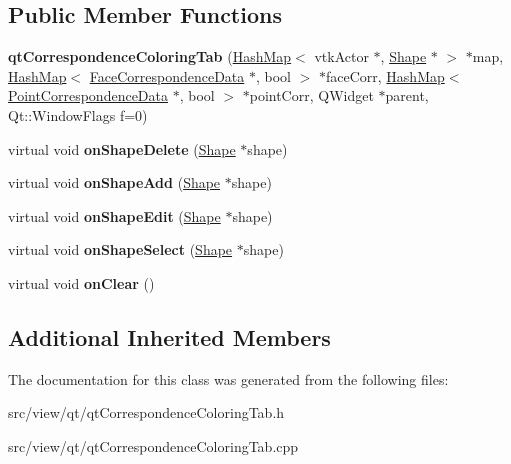 \subsection*{Public Member Functions}
\begin{DoxyCompactItemize}
\item 
\hypertarget{classqt_correspondence_coloring_tab_a8f793bb0b1e4fcd2930a6fc8dda03ff4}{}{\bfseries qt\+Correspondence\+Coloring\+Tab} (\hyperlink{class_hash_map}{Hash\+Map}$<$ vtk\+Actor $\ast$, \hyperlink{class_shape}{Shape} $\ast$ $>$ $\ast$map, \hyperlink{class_hash_map}{Hash\+Map}$<$ \hyperlink{class_face_correspondence_data}{Face\+Correspondence\+Data} $\ast$, bool $>$ $\ast$face\+Corr, \hyperlink{class_hash_map}{Hash\+Map}$<$ \hyperlink{class_point_correspondence_data}{Point\+Correspondence\+Data} $\ast$, bool $>$ $\ast$point\+Corr, Q\+Widget $\ast$parent, Qt\+::\+Window\+Flags f=0)\label{classqt_correspondence_coloring_tab_a8f793bb0b1e4fcd2930a6fc8dda03ff4}

\item 
\hypertarget{classqt_correspondence_coloring_tab_a731f7da293d21c87059515a10d36d1e3}{}virtual void {\bfseries on\+Shape\+Delete} (\hyperlink{class_shape}{Shape} $\ast$shape)\label{classqt_correspondence_coloring_tab_a731f7da293d21c87059515a10d36d1e3}

\item 
\hypertarget{classqt_correspondence_coloring_tab_aa42744063025d9b0d29b9a83817c0f27}{}virtual void {\bfseries on\+Shape\+Add} (\hyperlink{class_shape}{Shape} $\ast$shape)\label{classqt_correspondence_coloring_tab_aa42744063025d9b0d29b9a83817c0f27}

\item 
\hypertarget{classqt_correspondence_coloring_tab_a30c174762eda93581d7f93bf4d247788}{}virtual void {\bfseries on\+Shape\+Edit} (\hyperlink{class_shape}{Shape} $\ast$shape)\label{classqt_correspondence_coloring_tab_a30c174762eda93581d7f93bf4d247788}

\item 
\hypertarget{classqt_correspondence_coloring_tab_af02e0bad7197ef2a4fba5e67a6d5f4e2}{}virtual void {\bfseries on\+Shape\+Select} (\hyperlink{class_shape}{Shape} $\ast$shape)\label{classqt_correspondence_coloring_tab_af02e0bad7197ef2a4fba5e67a6d5f4e2}

\item 
\hypertarget{classqt_correspondence_coloring_tab_a3f5f147052eb9b10c08af1160ff85f42}{}virtual void {\bfseries on\+Clear} ()\label{classqt_correspondence_coloring_tab_a3f5f147052eb9b10c08af1160ff85f42}

\end{DoxyCompactItemize}
\subsection*{Additional Inherited Members}


The documentation for this class was generated from the following files\+:\begin{DoxyCompactItemize}
\item 
src/view/qt/qt\+Correspondence\+Coloring\+Tab.\+h\item 
src/view/qt/qt\+Correspondence\+Coloring\+Tab.\+cpp\end{DoxyCompactItemize}
